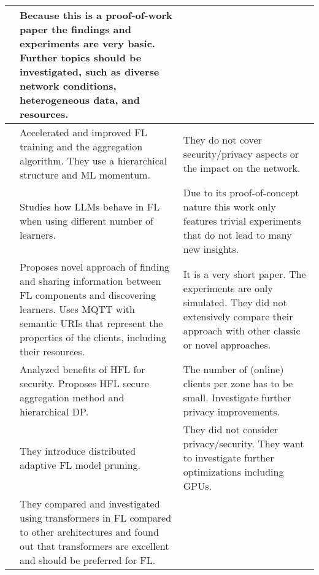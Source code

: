 \begin{changemargin}{-2cm}{0cm}
\begin{tabular}{|c||m{0.4\paperwidth}|m{0.4\paperwidth}|}
            &
            Because this is a proof-of-work paper the findings and experiments are very basic.
            Further topics should be investigated, such as diverse network conditions, heterogeneous data, and resources.
        \\
        \hline
            \cite{paper:hfl_with_momentum_acceleration_in_multi_tier_networks}
            &
            Accelerated and improved FL training and the aggregation algorithm.
            They use a hierarchical structure and ML momentum.
            &
            They do not cover security/privacy aspects or the impact on the network.
        \\
        \hline
            \cite{paper:scaling_fl_for_fine_tuning_llms}
            &
            Studies how LLMs behave in FL when using different number of learners.
            &
            Due to its proof-of-concept nature this work only features trivial experiments that do not lead to many new insights.
        \\
        \hline
            \cite{paper:edge_fl_via_mqtt_and_oma_lightweight_m2m}
            &
            Proposes novel approach of finding and sharing information between FL components and discovering learners.
            Uses MQTT with semantic URIs that represent the properties of the clients, including their resources.
            &
            It is a very short paper.
            The experiments are only simulated.
            They did not extensively compare their approach with other classic or novel approaches.
        \\
        \hline
            \cite{paper:hfl_with_privacy}
            &
            Analyzed benefits of HFL for security.
            Proposes HFL secure aggregation method
            and hierarchical DP.
            &
            The number of (online) clients per zone has to be small.
            Investigate further privacy improvements.
        \\
        \hline
            \cite{paper:model_pruning_for_edge_fl}
            &
            They introduce distributed adaptive FL model pruning.
            &
            They did not consider privacy/security.
            They want to investigate further optimizations including GPUs.
        \\
        \hline
            \cite{paper:rethinking_architecture_design_in_fl_for_diverse_data}
            &
            They compared and investigated using transformers in FL compared to other architectures
            and found out that transformers are excellent and should be preferred for FL.

\end{tabular}
\end{changemargin}
